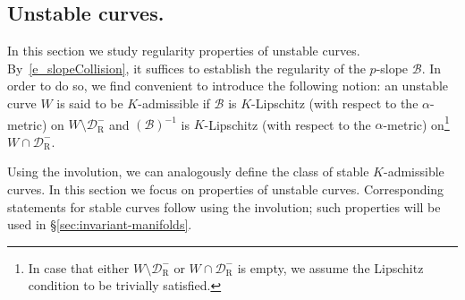 \documentclass[10pt]{amsart}
\theoremstyle{definition}\newtheorem{defi}[theo]{Definition}\newtheorem{rema}[theo]{Remark}\newtheorem{exam}[theo]{Example}\newtheorem{exem}[theo]{Example}\newtheorem{nota}[theo]{Notation}
\newcommand{\inv}{^{-1}}
\newcommand{\cB}{\mathcal{B}}
\newcommand{\pslope}{\mathcal{B}}
\newcommand{\cell}{\mathcal{D}}
\newcommand{\recoPrivate}{\mathrm{R}}
\newcommand{\reco}{{\cell^-_{\recoPrivate}}}
\newcommand{\ppPrivate}[2]{#1^{#2}}
\newcommand{\prePrivate}[1]{\ppPrivate{#1}{-}}
\newcommand{\prpslope}{\prePrivate{\pslope}}
\newcommand{\admiss}{admissible}
\newcommand{\admName}{\alpha^{+}}
\renewcommand{\admName}{\alpha}
\renewcommand{\prpslope}{\cB}
\renewcommand{\prpslope}{\cB}
\renewcommand{\prpslope}{\cB}
\begin{document}
\subsection{Unstable curves.}\label{sec:unstable-curves}
In this section we study regularity properties of unstable curves. By~\eqref{e_slopeCollision}, it suffices to establish the regularity of the $p$-slope $\prpslope$. In order to do so, we find convenient to introduce the following notion: an unstable curve $W$ is said to be $K$-\admiss{} if $\prpslope$ is $K$-Lipschitz (with respect to the $\admName$-metric) on $W\setminus\reco$ and $(\prpslope)\inv$ is $K$-Lipschitz (with respect to the $\admName$-metric) on\footnote{ In case that either $W\setminus\reco$ or $W\cap\reco$ is empty, we assume the Lipschitz condition to be trivially satisfied.} $W\cap\reco$.

Using the involution, we can analogously define the class of stable $K$-\admiss{} curves. In this section we focus on properties of unstable curves. Corresponding statements for stable curves follow using the involution; such properties will be used in \S\ref{sec:invariant-manifolds}.
\end{document}

